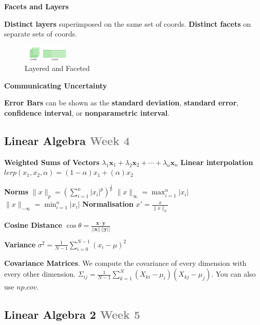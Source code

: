 \documentclass{article}
\begin{document}
\vspace{\baselineskip}

\textbf{Facets and Layers}

\textbf{Distinct layers} superimposed on the same set of coords.
\textbf{Distinct facets} on separate sets of coords.


\begin{figure}[h]
    \centering
    \includegraphics[width=0.2\textwidth]{assets/layered-faceted.png}
    \caption{Layered and Faceted}\label{fig:layered-faceted}
\end{figure}

\vspace{\baselineskip}

\textbf{Communicating Uncertainty}

\textbf{Error Bars} can be shown as the \textbf{standard deviation}, \textbf{standard error}, \textbf{confidence interval}, or \textbf{nonparametric interval}.


\clearpage

\subsection*{Linear Algebra \small\textcolor{gray}{Week 4}}


\textbf{Weighted Sums of Vectors}
$\lambda_1 \mathbf{x}_1 + \lambda_2 \mathbf{x}_2 + \cdots + \lambda_n \mathbf{x}_n$
\textbf{Linear interpolation}
$lerp(x_1, x_2, \alpha) = (1 - \alpha)x_1 + (\alpha)x_2$

\textbf{Norms}
$\|x\|_p = {(\sum_{i=1}^{n} |x_i|^p)}^{\frac{1}{p}}$
$\|x\|_\infty = \max_{i=1}^{n} |x_i|$
$\|x\|_{-\infty} = \min_{i=1}^{n} |x_i|$
\textbf{Normalisation} $x' = \frac{x}{\|x\|_p}$

\textbf{Cosine Distance}
$\cos \theta = \frac{\mathbf{x} \cdot \mathbf{y}}{||\mathbf{x}|| \, ||\mathbf{y}||}$

\textbf{Variance}
$\sigma^2 = \frac{1}{N - 1} \sum_{i=0}^{N-1} {(x_i - \mu)}^2$

\textbf{Covariance Matrices}.
We compute the covariance of every dimension with every other dimension.
$\Sigma_{ij} = \frac{1}{N - 1} \sum_{k=1}^{N} (X_{ki} - \mu_i)(X_{kj} - \mu_j)$.
You can also use $np.cov$.


\subsection*{Linear Algebra 2 \small\textcolor{gray}{Week 5}}
\end{document}
